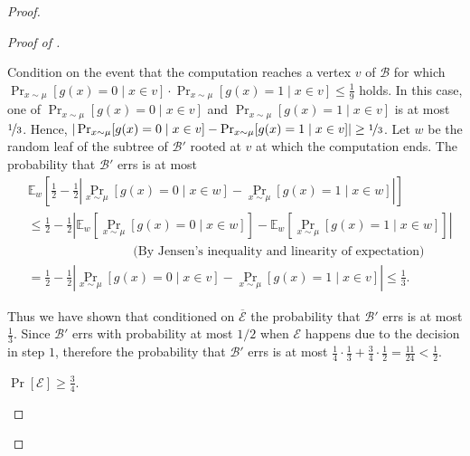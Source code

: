 \documentclass{toc}
\newcommand{\dr}{\nicefrac}
\newcommand{\clB}{\mathcal{B}}
\newcommand{\clE}{\mathcal{E}}
\newcommand{\E}{\mathbb{E}}
\begin{document}
\begin{proof}
\begin{proof}[Proof of {}]
\begin{description}
Condition on the event that the computation reaches a vertex $v$ of $\clB$ for which $\Pr_{x \sim \mu}[g(x)=0 \mid x \in v]\cdot\Pr_{x \sim \mu}[g(x)=1 \mid x \in v] \leq \frac{1}{9}$ holds. In this case, one of $\Pr_{x \sim \mu}[g(x)=0 \mid x \in v]$ and $\Pr_{x \sim \mu}[g(x)=1 \mid x \in v]$ is at most $\dr13$. Hence,  $|\Pr_{x \sim \mu}[g(x)=0 \mid x \in v]-\Pr_{x \sim \mu}[g(x)=1 \mid x \in v]| \geq \dr13$. Let $w$ be the random leaf of the subtree of $\clB'$ rooted at $v$ at which the computation ends. The probability that $\clB'$ errs is at most
\begin{align*}
&\E_w\left[\frac{1}{2}-\frac{1}{2}\left|\Pr_{x \sim \mu}[g(x)=0 \mid x \in w]-\Pr_{x \sim \mu}[g(x)=1 \mid x \in w]\right|\right] \\
& \leq \frac{1}{2}-\frac{1}{2} \left|\E_w\left[\Pr_{x \sim \mu}[g(x)=0 \mid x \in w]\right]-\E_w\left[\Pr_{x \sim \mu}[g(x)=1 \mid x \in w]\right]\right| \\
& \qquad \qquad \qquad \qquad \mbox{\ \ \ \ (By Jensen's inequality and linearity of expectation)} \\
&=\frac{1}{2}-\frac{1}{2}\left|\Pr_{x \sim \mu}[g(x)=0 \mid x \in v]-\Pr_{x \sim \mu}[g(x)=1 \mid x \in v]\right| \leq \frac{1}{3}.
\end{align*}

Thus we have shown that conditioned on $\overline{\clE}$ the probability that $\clB'$ errs is at most $\frac{1}{3}$. Since $\clB'$ errs with probability at most $1/2$ when $\clE$ happens due to the decision in step $1$, therefore the probability that $\clB'$ errs is at most $\frac{1}{4}\cdot \frac{1}{3}+\frac{3}{4}\cdot\frac{1}{2} = \frac{11}{24}<\frac{1}{2}$.
\item[Case $2$:] $\Pr[\clE] \geq \frac{3}{4}$.


\end{description}
\end{proof}
\end{proof}
\end{document}
